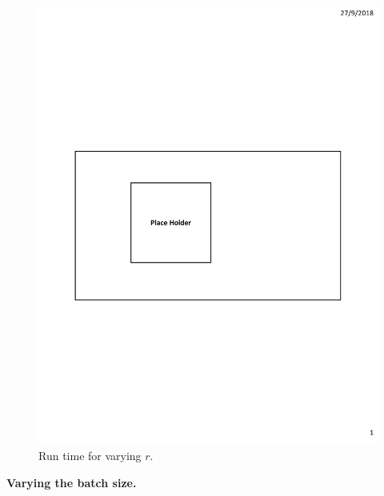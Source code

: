 \begin{figure}[h]
\begin{minipage}{0.18\linewidth}
		\includegraphics[width=\linewidth]{fig/PlaceHolder.pdf}
		\centerline{\dsrandom}
	\end{minipage}
	\caption{Run time for varying $r$.}
	\label{fig:vary-r-time}
\end{figure}

\vspace{1mm}\noindent\textbf{Varying the batch size.}

